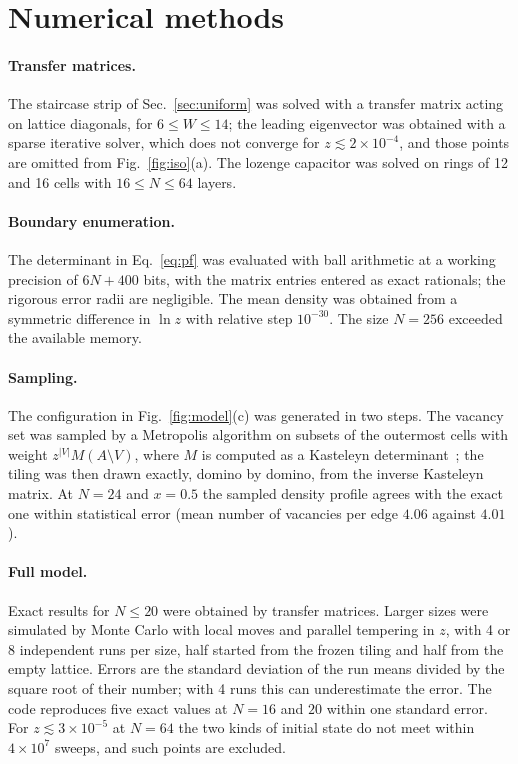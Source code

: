 \documentclass[reprint,aps,pre,superscriptaddress,longbibliography,floatfix,amsmath,amssymb]{revtex4-2}
\begin{document}
\section{Numerical methods}\label{app:numerics}

\paragraph*{Transfer matrices.} The staircase strip of Sec.~\ref{sec:uniform} was solved with a transfer matrix acting on lattice diagonals, for $6\le W\le14$; the leading eigenvector was obtained with a sparse iterative solver, which does not converge for $z\lesssim2\times10^{-4}$, and those points are omitted from Fig.~\ref{fig:iso}(a). The lozenge capacitor was solved on rings of 12 and 16 cells with $16\le N\le64$ layers.

\paragraph*{Boundary enumeration.} The determinant in Eq.~\eqref{eq:pf} was evaluated with ball arithmetic at a working precision of $6N+400$ bits, with the matrix entries entered as exact rationals; the rigorous error radii are negligible. The mean density was obtained from a symmetric difference in $\ln z$ with relative step $10^{-30}$. The size $N=256$ exceeded the available memory.

\paragraph*{Sampling.} The configuration in Fig.~\ref{fig:model}(c) was generated in two steps. The vacancy set was sampled by a Metropolis algorithm on subsets of the outermost cells with weight $z^{|V|}M(A\setminus V)$, where $M$ is computed as a Kasteleyn determinant~\cite{TODO-kasteleyn1961}; the tiling was then drawn exactly, domino by domino, from the inverse Kasteleyn matrix. At $N=24$ and $x=0.5$ the sampled density profile agrees with the exact one within statistical error (mean number of vacancies per edge $4.06$ against $4.01$).

\paragraph*{Full model.} Exact results for $N\le20$ were obtained by transfer matrices. Larger sizes were simulated by Monte Carlo with local moves and parallel tempering in $z$, with 4 or 8 independent runs per size, half started from the frozen tiling and half from the empty lattice. Errors are the standard deviation of the run means divided by the square root of their number; with 4 runs this can underestimate the error. The code reproduces five exact values at $N=16$ and $20$ within one standard error. For $z\lesssim3\times10^{-5}$ at $N=64$ the two kinds of initial state do not meet within $4\times10^7$ sweeps, and such points are excluded.
\end{document}
